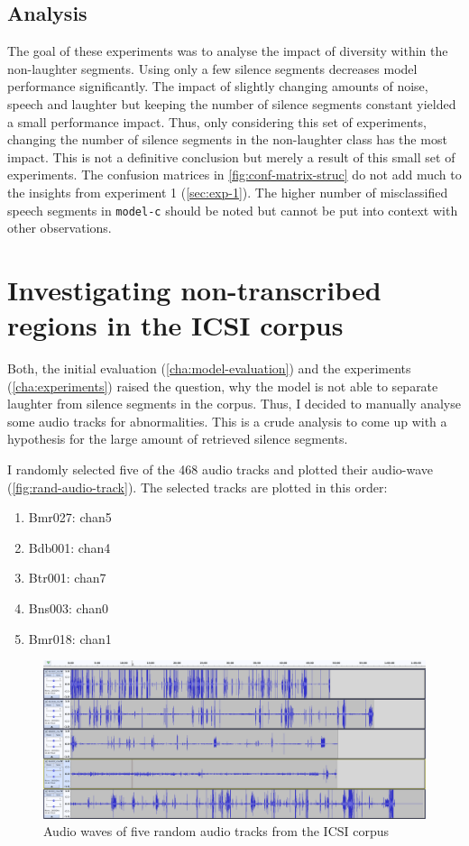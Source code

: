 \documentclass[bsc,frontabs,parskip,deptreport]{infthesis}
\begin{document}
\subsection{Analysis}
The goal of these experiments was to analyse the impact of diversity within the non-laughter segments. Using only a few silence segments decreases model performance significantly.
The impact of slightly changing amounts of noise, speech and laughter but keeping the number of silence segments constant yielded a small performance impact. 
Thus, only considering this set of experiments, changing the number of silence segments in the non-laughter class has the most impact. 
This is not a definitive conclusion but merely a result of this small set of experiments. 
The confusion matrices in \autoref{fig:conf-matrix-struc} do not add much to the insights from experiment 1 (\autoref{sec:exp-1}). The higher number of misclassified speech segments in \texttt{model-c} should be noted but cannot be put into context with other observations.


\section{Investigating non-transcribed regions in the ICSI corpus} \label{sec:silence-regions}
Both, the initial evaluation (\autoref{cha:model-evaluation}) and the experiments (\autoref{cha:experiments}) raised the question, why the model is not able to separate laughter from silence segments in the corpus. Thus, I decided to manually analyse some audio tracks for abnormalities. This is a crude analysis to come up with a hypothesis for the large amount of retrieved silence segments.

I randomly selected five of the 468 audio tracks and plotted their audio-wave (\autoref{fig:rand-audio-track}). The selected tracks are plotted in this order:
\begin{enumerate}
    \item Bmr027: chan5
    \item Bdb001: chan4
    \item Btr001: chan7
    \item Bns003: chan0
    \item Bmr018: chan1
\end{enumerate}

\begin{figure}[h!]
    \centering
    \includegraphics[width=14cm]{imgs/audio_waves/plotted_audio_waves.png}
    \caption{Audio waves of five random audio tracks from the ICSI corpus}
    \label{fig:rand-audio-track}
\end{figure}
\end{document}
